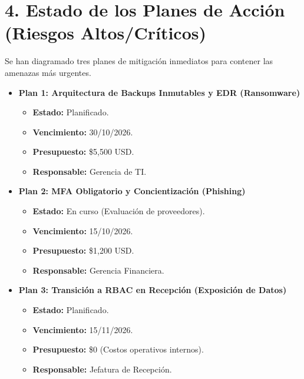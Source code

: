 \documentclass[11pt,a4paper]{article}
\begin{document}
\vspace{0.8cm}

\section*{4. Estado de los Planes de Acción (Riesgos Altos/Críticos)}
Se han diagramado tres planes de mitigación inmediatos para contener las amenazas más urgentes.

\vspace{0.3cm}
\begin{itemize}[leftmargin=*]
    \item \textbf{Plan 1: Arquitectura de Backups Inmutables y EDR (Ransomware)}
    \begin{itemize}
        \item \textbf{Estado:} Planificado.
        \item \textbf{Vencimiento:} 30/10/2026.
        \item \textbf{Presupuesto:} \$5,500 USD.
        \item \textbf{Responsable:} Gerencia de TI.
    \end{itemize}
    \vspace{0.2cm}
    
    \item \textbf{Plan 2: MFA Obligatorio y Concientización (Phishing)}
    \begin{itemize}
        \item \textbf{Estado:} En curso (Evaluación de proveedores).
        \item \textbf{Vencimiento:} 15/10/2026.
        \item \textbf{Presupuesto:} \$1,200 USD.
        \item \textbf{Responsable:} Gerencia Financiera.
    \end{itemize}
    \vspace{0.2cm}
    
    \item \textbf{Plan 3: Transición a RBAC en Recepción (Exposición de Datos)}
    \begin{itemize}
        \item \textbf{Estado:} Planificado.
        \item \textbf{Vencimiento:} 15/11/2026.
        \item \textbf{Presupuesto:} \$0 (Costos operativos internos).
        \item \textbf{Responsable:} Jefatura de Recepción.
    \end{itemize}
\end{itemize}
\end{document}
